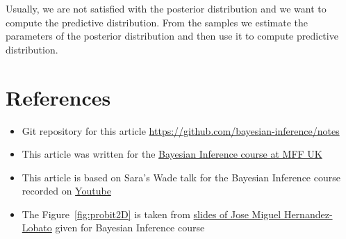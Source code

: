 Usually, we are not satisfied with the posterior distribution and we want to compute the predictive distribution. From the samples we estimate the parameters of the posterior distribution and then use it to compute predictive distribution.





\section*{References}
\begin{itemize}
    \item Git repository for this article \url{https://github.com/bayesian-inference/notes}
    \item This article was written for the \href{https://sites.google.com/site/filipjurcicek/teaching/bayesian-inference}{Bayesian Inference course at MFF UK}
    \item This article is based on Sara's Wade talk for the Bayesian Inference course recorded on \href{http://youtu.be/rsUt9uV6j70?t=12m18s}{Youtube}
    \item The Figure~\ref{fig:probit2D} is taken from \href{https://sites.google.com/site/filipjurcicek/teaching/bayesian-inference/NPFL108-slidesLecture3.pdf?attredirects=0}{slides of Jose Miguel Hernandez-Lobato} given for Bayesian Inference course
\end{itemize}





